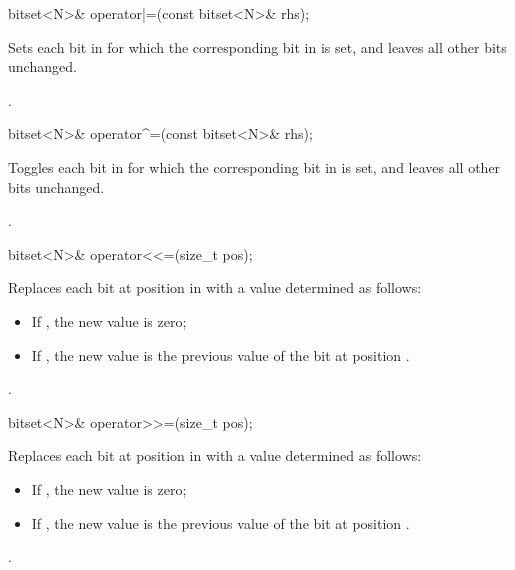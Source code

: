 %
\begin{itemdecl}
bitset<N>& operator|=(const bitset<N>& rhs);
\end{itemdecl}

\begin{itemdescr}
\pnum
\effects
Sets each bit in
for which the corresponding bit in  is set, and leaves all other bits unchanged.

\pnum
\returns
{}.
\end{itemdescr}

%
\begin{itemdecl}
bitset<N>& operator^=(const bitset<N>& rhs);
\end{itemdecl}

\begin{itemdescr}
\pnum
\effects
Toggles each bit in
for which the corresponding bit in  is set, and leaves all other bits unchanged.

\pnum
\returns
{}.
\end{itemdescr}

%
\begin{itemdecl}
bitset<N>& operator<<=(size_t pos);
\end{itemdecl}

\begin{itemdescr}
\pnum
\effects
Replaces each bit at position  in
with a value determined as follows:

\begin{itemize}
\item
If , the new value is zero;
\item
If , the new value is the previous
value of the bit at position .
\end{itemize}

\pnum
\returns
{}.
\end{itemdescr}

%
\begin{itemdecl}
bitset<N>& operator>>=(size_t pos);
\end{itemdecl}

\begin{itemdescr}
\pnum
\effects
Replaces each bit at position  in
with a value determined as follows:

\begin{itemize}
\item
If , the new value is zero;
\item
If , the new value is the previous value of the bit at position .
\end{itemize}

\pnum
\returns
{}.
\end{itemdescr}

